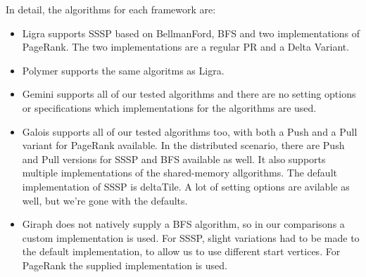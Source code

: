 In detail, the algorithms for each framework are:
\begin{itemize}
	\item Ligra supports SSSP based on BellmanFord, BFS and two implementations of PageRank. The two implementations are a regular PR and a Delta Variant.
	\item Polymer supports the same algoritms as Ligra.
	\item Gemini supports all of our tested algorithms and there are no setting options or specifications which implementations for the algorithms are used.
	\item Galois supports all of our tested algorithms too, with both a Push and a Pull variant for PageRank available. In the distributed scenario, there are Push and Pull versions for SSSP and BFS available as well. It also supports multiple implementations of the shared-memory allgorithms. The default implementation of SSSP is deltaTile. A lot of setting options are avilable as well, but we're gone with the defaults.
	\item Giraph does not natively supply a BFS algorithm, so in our comparisons a custom implementation is used. For SSSP, slight variations had to be made to the default implementation, to allow us to use different start vertices. For PageRank the supplied implementation is used.
\end{itemize}


